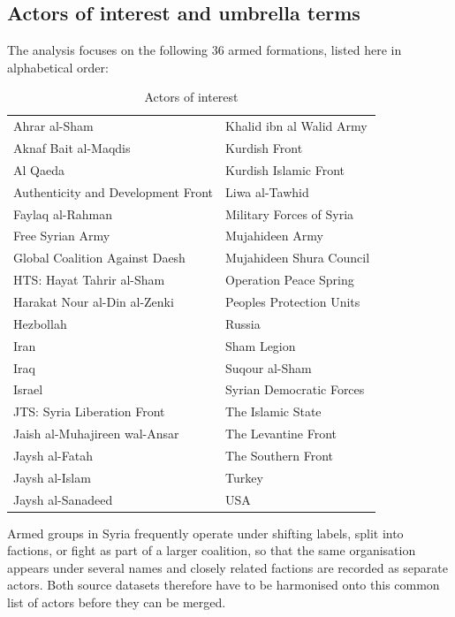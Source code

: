 \subsection{Actors of interest and umbrella terms}
\label{app:umbrella}

The analysis focuses on the following $36$ armed formations, listed here in
alphabetical order:

\begin{table}[htbp]
\centering
\caption{Actors of interest}
\label{tab:actors_of_interest}
\begin{tabular}{ll}
\hline\hline
Ahrar al-Sham & Khalid ibn al Walid Army \\
Aknaf Bait al-Maqdis & Kurdish Front \\
Al Qaeda & Kurdish Islamic Front \\
Authenticity and Development Front & Liwa al-Tawhid \\
Faylaq al-Rahman & Military Forces of Syria \\
Free Syrian Army & Mujahideen Army \\
Global Coalition Against Daesh & Mujahideen Shura Council \\
HTS: Hayat Tahrir al-Sham & Operation Peace Spring \\
Harakat Nour al-Din al-Zenki & Peoples Protection Units \\
Hezbollah & Russia \\
Iran & Sham Legion \\
Iraq & Suqour al-Sham \\
Israel & Syrian Democratic Forces \\
JTS: Syria Liberation Front & The Islamic State \\
Jaish al-Muhajireen wal-Ansar & The Levantine Front \\
Jaysh al-Fatah & The Southern Front \\
Jaysh al-Islam & Turkey \\
Jaysh al-Sanadeed & USA \\
\hline\hline
\end{tabular}
\end{table}

Armed groups in Syria frequently operate under shifting labels, split into
factions, or fight as part of a larger coalition, so that the same organisation
appears under several names and closely related factions are recorded as
separate actors. Both source datasets therefore have to be harmonised onto this
common list of actors before they can be merged.

